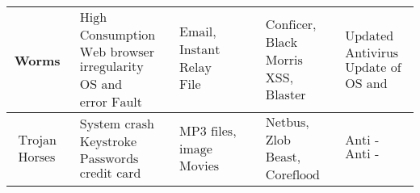 \documentclass{ijitcs}
\begin{document}
\begin{table}[h]
{\begin{tabular}{|c|c|c|c|c|}
            \hline
            Worms                                                            &  $\begin{array}{l}      \text{High bandwidth } \\ \text{Consumption} \\ \text{Web browser } \\ \text{irregularity} \\ \text{OS and System} \\ \text{error Fault}    \end{array}$   & $\begin{array}{l}    \text{Email,} \\  \text{Instant Messaging,} \\  \text{Relay Chats,} \\  \text{File Sharing}     \end{array}$   & $\begin{array}{l}   \text{Conficer,} \\    \text{Black worm,} \\    \text{Morris wom,} \\    \text{XSS, Ramnit worm,} \\    \text{Blaster wom}   \end{array}$  &  $\begin{array}{l}        \text{Updated  firewall and} \\    \text{Antivirus software} \\    \text{Update of} \\    \text{OS and Software}   \end{array}$       \\
            \hline  
            $\begin{array}{l}\text{Trojan} \\  \text{Horses}   \end{array}$   &  $\begin{array}{l}        \text{System crash}   \\ \text{Keystroke logging}   \\ \text{Passwords and}   \\ \text{credit card theft}     \end{array}$    & $\begin{array}{l}        \text{MP3 files,}   \\ \text{image games,}   \\ \text{Movies}     \end{array}$    & $\begin{array}{l}        \text{Netbus, Vundu,}   \\ \text{Zlob Trojan,}   \\ \text{Beast, Zeus,}   \\ \text{Coreflood}     \end{array}$   & $\begin{array}{l}        \text{Anti - virus software}   \\ \text{Anti - Trojan Programs}     \end{array}$         \\

\end{tabular}}
\end{table}
\end{document}
